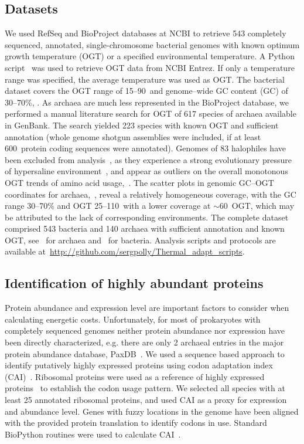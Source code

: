 \documentclass[10pt,letterpaper]{article}
\newcommand{\PROTEINLIMIT}{600}
\begin{document}
\subsection*{Datasets}
We used RefSeq and BioProject databases at NCBI to retrieve 543 completely sequenced, annotated, single-chromosome bacterial genomes with known optimum growth temperature (OGT) or a specified environmental temperature. A Python script~\cite{Cock2009Biopython} was used to retrieve OGT data from NCBI Entrez. If only a temperature range was specified, the average temperature was used as OGT. The bacterial dataset covers the OGT range of 15--90\textcelsius\, and genome--wide GC content (GC) of 30--70\%, .
As archaea are much less represented in the BioProject database, we performed a manual literature search for OGT of 617 species of archaea available in GenBank. The search yielded 223 species with known OGT and sufficient annotation (whole genome shotgun assemblies were included, if at least \PROTEINLIMIT\ protein coding sequences were annotated). Genomes of 83 halophiles have been excluded from analysis~, as they experience a strong evolutionary pressure of hypersaline environment~\cite{Fukuchi2003Unique}, and appear as outliers on the overall monotonous OGT trends of amino acid usage,~. The scatter plots in genomic GC--OGT coordinates for archaea,~, reveal a relatively homogeneous coverage, with the GC range 30--70\% and OGT 25--110\textcelsius\ with a lower coverage at $\sim$60\textcelsius\ OGT, which may be attributed to the lack of corresponding environments. The complete dataset comprised 543 bacteria and 140 archaea with sufficient annotation and known OGT, see~ for archaea and~ for bacteria. Analysis scripts and protocols are available at~\url{http://github.com/sergpolly/Thermal_adapt_scripts}.

\subsection*{Identification of highly abundant proteins}
Protein abundance and expression level are important factors to consider when calculating energetic costs. Unfortunately, for most of prokaryotes with completely sequenced genomes neither protein abundance nor expression have been directly characterized, e.g. there are only 2 archaeal entries in the major protein abundance database, PaxDB~\cite{Wang2015Version}. We used a sequence based approach to identify putatively highly expressed proteins using codon adaptation index (CAI)~\cite{Sharp1987The}. Ribosomal proteins were used as a reference of highly expressed proteins~\cite{Pedersen1978Patterns,Srivastava1990Mechanism} to establish the codon usage pattern. We selected all species with at least 25 annotated ribosomal proteins, and used CAI as a proxy for expression and abundance level. Genes with fuzzy locations in the genome have been aligned with the provided protein translation to identify codons in use. Standard BioPython routines were used to calculate CAI~\cite{Cock2009Biopython}. 
\end{document}
